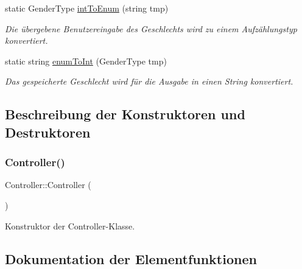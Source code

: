 \begin{DoxyCompactItemize}
static Gender\+Type \hyperlink{classContactManager_1_1Controller_ac4295728664d4137e39478cd3e30e0fd}{int\+To\+Enum} (string tmp)
\begin{DoxyCompactList}\small\item\em Die übergebene Benutzereingabe des Geschlechts wird zu einem Aufzählungstyp konvertiert.\end{DoxyCompactList}\item 
static string \hyperlink{classContactManager_1_1Controller_a6989880aa8c549f03067cb7d8d1be7a6}{enum\+To\+Int} (Gender\+Type tmp)
\begin{DoxyCompactList}\small\item\em Das gespeicherte Geschlecht wird für die Ausgabe in einen String konvertiert.\end{DoxyCompactList}\end{DoxyCompactItemize}


\subsection{Beschreibung der Konstruktoren und Destruktoren}
\mbox{\label{classContactManager_1_1Controller_a95c56822d667e94b031451729ce069a9}} 
\subsubsection{\texorpdfstring{Controller()}{Controller()}}
{\footnotesize\ttfamily Controller\+::\+Controller (\begin{DoxyParamCaption}{ }\end{DoxyParamCaption})}



Konstruktor der Controller-\/\+Klasse.



\subsection{Dokumentation der Elementfunktionen}
\mbox{\label{classContactManager_1_1Controller_afd2e274df3edef5ab0abf90aae5ad21c}} 
